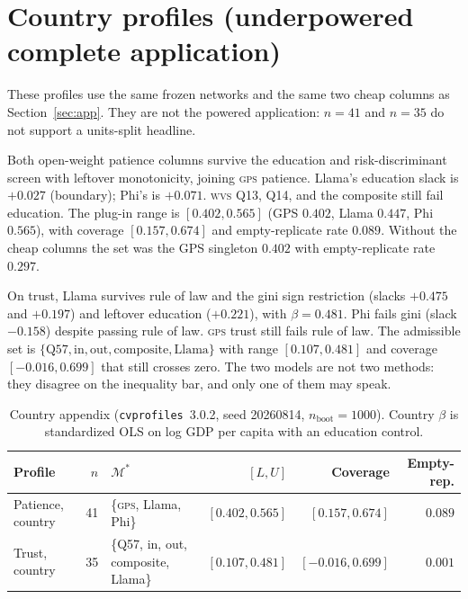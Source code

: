 \documentclass[10pt,letterpaper]{article}
\newcommand{\GPS}{\textsc{gps}}
\newcommand{\WVS}{\textsc{wvs}}
\newcommand{\cvp}{\texttt{cvprofiles}}
\newcommand{\M}{\ensuremath{\mathcal{M}}}
\begin{document}
\section{Country profiles (underpowered complete application)}
\label{app:country}

These profiles use the same frozen networks and the same two cheap columns as Section~\ref{sec:app}.
They are not the powered application: $n=41$ and $n=35$ do not support a units-split headline.

Both open-weight patience columns survive the education and risk-discriminant screen with leftover monotonicity, joining \GPS{} patience.
Llama's education slack is $+0.027$ (boundary); Phi's is $+0.071$.
\WVS{} Q13, Q14, and the composite still fail education.
The plug-in range is $[0.402,0.565]$ (GPS $0.402$, Llama $0.447$, Phi $0.565$), with coverage $[0.157,0.674]$ and empty-replicate rate $0.089$.
Without the cheap columns the set was the GPS singleton $0.402$ with empty-replicate rate $0.297$.

On trust, Llama survives rule of law and the gini sign restriction (slacks $+0.475$ and $+0.197$) and leftover education ($+0.221$), with $\beta=0.481$.
Phi fails gini (slack $-0.158$) despite passing rule of law.
\GPS{} trust still fails rule of law.
The admissible set is $\{\mathrm{Q57},\mathrm{in},\mathrm{out},\mathrm{composite},\mathrm{Llama}\}$ with range $[0.107,0.481]$ and coverage $[-0.016,0.699]$ that still crosses zero.
The two models are not two methods: they disagree on the inequality bar, and only one of them may speak.

\begin{table}[ht]
\centering
\small
\caption{Country appendix (\cvp{}~3.0.2, seed 20260814, $n_{\mathrm{boot}}=1000$).
Country $\beta$ is standardized OLS on log GDP per capita with an education control.}
\label{tab:country_llm}
\begin{tabularx}{\textwidth}{@{}>{\raggedright\arraybackslash}p{2.8cm} r >{\raggedright\arraybackslash}p{4.2cm} r r r@{}}
\toprule
\textbf{Profile} & $n$ & $\M^*$ & $[L,U]$ & \textbf{Coverage} & \textbf{Empty-rep.} \\
\midrule
Patience, country & 41 & \{\GPS{}, Llama, Phi\} & $[0.402,0.565]$ & $[0.157,0.674]$ & $0.089$ \\
Trust, country & 35 & \{Q57, in, out, composite, Llama\} & $[0.107,0.481]$ & $[-0.016,0.699]$ & $0.001$ \\
\bottomrule
\end{tabularx}
\end{table}
\end{document}
